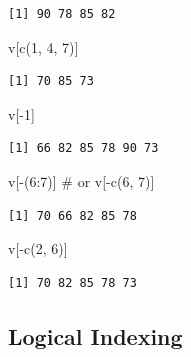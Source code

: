 \documentclass[
  letterpaper,
  DIV=11,
  numbers=noendperiod]{scrreprt}
\newenvironment{Shaded}{\begin{snugshade}}{\end{snugshade}}
\newcommand{\CommentTok}[1]{\textcolor[rgb]{0.37,0.37,0.37}{#1}}
\newcommand{\DecValTok}[1]{\textcolor[rgb]{0.68,0.00,0.00}{#1}}
\newcommand{\FunctionTok}[1]{\textcolor[rgb]{0.28,0.35,0.67}{#1}}
\newcommand{\NormalTok}[1]{\textcolor[rgb]{0.00,0.23,0.31}{#1}}
\newcommand{\SpecialCharTok}[1]{\textcolor[rgb]{0.37,0.37,0.37}{#1}}
\begin{document}
\begin{tcolorbox}
\begin{verbatim}
[1] 90 78 85 82
\end{verbatim}

\begin{Shaded}
\begin{Highlighting}[]
\NormalTok{v[}\FunctionTok{c}\NormalTok{(}\DecValTok{1}\NormalTok{, }\DecValTok{4}\NormalTok{, }\DecValTok{7}\NormalTok{)]}
\end{Highlighting}
\end{Shaded}

\begin{verbatim}
[1] 70 85 73
\end{verbatim}

\begin{Shaded}
\begin{Highlighting}[]
\NormalTok{v[}\SpecialCharTok{{-}}\DecValTok{1}\NormalTok{]}
\end{Highlighting}
\end{Shaded}

\begin{verbatim}
[1] 66 82 85 78 90 73
\end{verbatim}

\begin{Shaded}
\begin{Highlighting}[]
\NormalTok{v[}\SpecialCharTok{{-}}\NormalTok{(}\DecValTok{6}\SpecialCharTok{:}\DecValTok{7}\NormalTok{)]    }\CommentTok{\# or v[{-}c(6, 7)]}
\end{Highlighting}
\end{Shaded}

\begin{verbatim}
[1] 70 66 82 85 78
\end{verbatim}

\begin{Shaded}
\begin{Highlighting}[]
\NormalTok{v[}\SpecialCharTok{{-}}\FunctionTok{c}\NormalTok{(}\DecValTok{2}\NormalTok{, }\DecValTok{6}\NormalTok{)]}
\end{Highlighting}
\end{Shaded}

\begin{verbatim}
[1] 70 82 85 78 73
\end{verbatim}

\end{tcolorbox}

\subsection{Logical Indexing}\label{logical-indexing}
\end{document}
